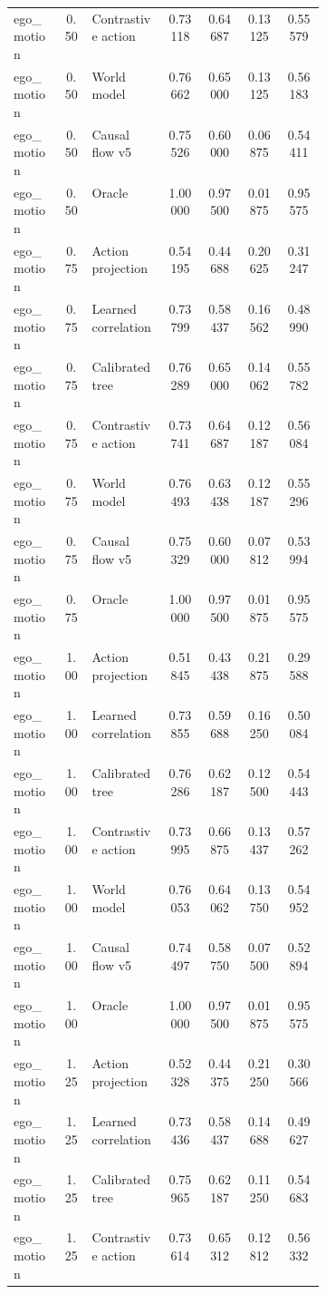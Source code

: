 \documentclass{article}
\begin{document}
\begin{center}
\begin{longtable}{p{0.16\linewidth}cp{0.24\linewidth}cccc}
ego\_motion & 0.50 & Contrastive action & 0.73118 & 0.64687 & 0.13125 & 0.55579\\
ego\_motion & 0.50 & World model & 0.76662 & 0.65000 & 0.13125 & 0.56183\\
ego\_motion & 0.50 & Causal flow v5 & 0.75526 & 0.60000 & 0.06875 & 0.54411\\
ego\_motion & 0.50 & Oracle & 1.00000 & 0.97500 & 0.01875 & 0.95575\\
ego\_motion & 0.75 & Action projection & 0.54195 & 0.44688 & 0.20625 & 0.31247\\
ego\_motion & 0.75 & Learned correlation & 0.73799 & 0.58437 & 0.16562 & 0.48990\\
ego\_motion & 0.75 & Calibrated tree & 0.76289 & 0.65000 & 0.14062 & 0.55782\\
ego\_motion & 0.75 & Contrastive action & 0.73741 & 0.64687 & 0.12187 & 0.56084\\
ego\_motion & 0.75 & World model & 0.76493 & 0.63438 & 0.12187 & 0.55296\\
ego\_motion & 0.75 & Causal flow v5 & 0.75329 & 0.60000 & 0.07812 & 0.53994\\
ego\_motion & 0.75 & Oracle & 1.00000 & 0.97500 & 0.01875 & 0.95575\\
ego\_motion & 1.00 & Action projection & 0.51845 & 0.43438 & 0.21875 & 0.29588\\
ego\_motion & 1.00 & Learned correlation & 0.73855 & 0.59688 & 0.16250 & 0.50084\\
ego\_motion & 1.00 & Calibrated tree & 0.76286 & 0.62187 & 0.12500 & 0.54443\\
ego\_motion & 1.00 & Contrastive action & 0.73995 & 0.66875 & 0.13437 & 0.57262\\
ego\_motion & 1.00 & World model & 0.76053 & 0.64062 & 0.13750 & 0.54952\\
ego\_motion & 1.00 & Causal flow v5 & 0.74497 & 0.58750 & 0.07500 & 0.52894\\
ego\_motion & 1.00 & Oracle & 1.00000 & 0.97500 & 0.01875 & 0.95575\\
ego\_motion & 1.25 & Action projection & 0.52328 & 0.44375 & 0.21250 & 0.30566\\
ego\_motion & 1.25 & Learned correlation & 0.73436 & 0.58437 & 0.14688 & 0.49627\\
ego\_motion & 1.25 & Calibrated tree & 0.75965 & 0.62187 & 0.11250 & 0.54683\\
ego\_motion & 1.25 & Contrastive action & 0.73614 & 0.65312 & 0.12812 & 0.56332\\

\end{longtable}
\end{center}
\end{document}
